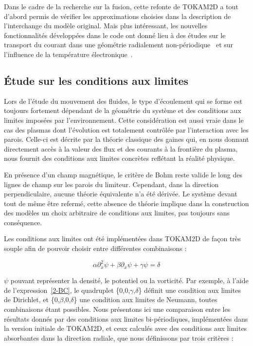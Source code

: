 \begin{refsection}
Dans le cadre de la recherche sur la fusion, cette refonte de TOKAM2D a tout
d'abord permis de vérifier les approximations choisies dans la description de
l'interchange du modèle original. Mais plus intéressant, les nouvelles
fonctionnalités développées dans le code ont donné lieu à des études sur
le transport du courant dans une géométrie radialement
non-périodique~\parencite{Futtersack} et sur l'influence de la température
électronique~\parencite{Moulton}.

\subsection{Étude sur les conditions aux limites}
	
	Lors de l'étude du mouvement des fluides, le type d'écoulement qui se
	forme est toujours fortement dépendant de la géométrie du système et des conditions aux limites
	imposées par l'environnement. Cette considération est aussi vraie dans le
	cas des plasmas dont l'évolution est totalement contrôlée par l'interaction
	avec les parois. Celle-ci est décrite par la théorie classique des gaines qui, 
	en nous donnant directement accès à la valeur des flux et des courants à la
	frontière du plasma, nous fournit des conditions aux limites concrètes
	reflétant la réalité physique.
	
	En présence d'un champ magnétique, le critère de Bohm reste valide le long
	des lignes de champ sur les parois du limiteur. Cependant, dans la direction
	perpendiculaire, aucune théorie équivalente n'a été dérivée. Le système devant
	tout de même être refermé, cette absence de théorie implique dans la
	construction des modèles un choix arbitraire de conditions aux limites, pas
	toujours sans conséquence.
	
	Les conditions aux limites ont été implémentées dans TOKAM2D de façon très
	souple afin de pouvoir choisir entre différentes combinaisons :
	
	\begin{equation}
	\label{2-BC}
		\alpha \partial^2_{x}\psi + \beta \partial_{x}\psi + \gamma \psi =
		\delta
	\end{equation}
	
	$\psi$ pouvant représenter la densité, le potentiel ou la vorticité. Par
	exemple, à l'aide de l'expression~\ref{2-BC}, le quadruplet
	\{0,0,$\gamma$,$\delta$\} définit une condition aux limites de Dirichlet, et
	\{0,$\beta$,0,$\delta$\} une condition aux limites de Neumann, toutes
	combinaisons étant possibles.
	Nous présentons ici une comparaison entre les résultats donnés par des
	conditions aux limites bi-périodiques, implémentées dans la version initiale de
	TOKAM2D, et ceux calculés avec des conditions aux limites absorbantes dans la
	direction radiale, que nous définissons par trois critères :
	

\end{refsection}

